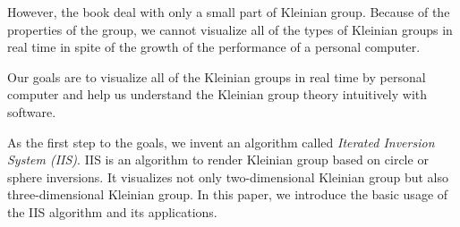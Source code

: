 However, the book deal with only a small part of Kleinian group.
Because of the properties of the group, we cannot
visualize all of the types of Kleinian groups in real time
in spite of the growth of the performance of a personal computer.

Our goals are to visualize all of the Kleinian groups in real time by
personal computer and help us understand the Kleinian group theory
intuitively with software.

As the first step to the goals, we invent an algorithm called
\textit{Iterated Inversion System (IIS)}.
IIS is an algorithm to render Kleinian group based on circle or sphere
inversions.
It visualizes not only two-dimensional Kleinian group but also
three-dimensional Kleinian group.
In this paper, we introduce the basic usage of the IIS algorithm and its
applications.

